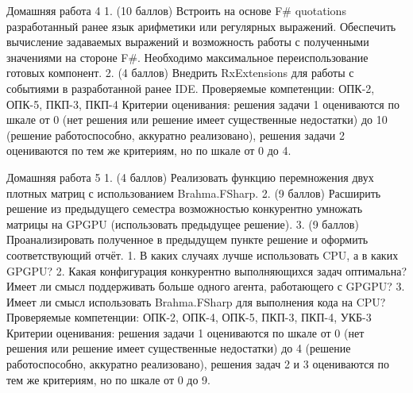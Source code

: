 Домашняя работа 4
    1. (10 баллов) Встроить на основе F# quotations разработанный ранее язык арифметики или регулярных выражений. Обеспечить вычисление задаваемых выражений и возможность работы с полученными значениями на стороне F#. Необходимо максимальное переиспользование готовых компонент.
    2. (4 баллов) Внедрить RxExtensions для работы с событиями в разработанной ранее IDE. 
Проверяемые компетенции: ОПК-2, ОПК-5, ПКП-3, ПКП-4
Критерии оценивания: решения задачи 1 оцениваются по шкале от 0 (нет решения или решение имеет существенные недостатки) до 10 (решение работоспособно, аккуратно реализовано), решения задачи 2 оцениваются по тем же критериям, но по шкале от 0 до 4.

Домашняя работа 5
    1. (4 баллов) Реализовать функцию перемножения двух плотных матриц с использованием Brahma.FSharp. 
    2. (9 баллов) Расширить решение из предыдущего семестра возможностью конкурентно умножать матрицы на GPGPU (использовать предыдущее решение).
    3. (9 баллов) Проанализировать полученное в предыдущем пункте решение и оформить соответствующий отчёт.
        1. В каких случаях лучше использовать CPU, а в каких GPGPU?
        2. Какая конфигурация конкурентно выполняющихся задач оптимальна? Имеет ли смысл поддерживать больше одного агента, работающего с GPGPU?
        3. Имеет ли смысл использовать Brahma.FSharp для выполнения кода на CPU?
Проверяемые компетенции: ОПК-2, ОПК-4, ОПК-5, ПКП-3, ПКП-4, УКБ-3
Критерии оценивания: решения задачи 1 оцениваются по шкале от 0 (нет решения или решение имеет существенные недостатки) до 4 (решение работоспособно, аккуратно реализовано), решения задач 2 и 3 оцениваются по тем же критериям, но по шкале от 0 до 9.

